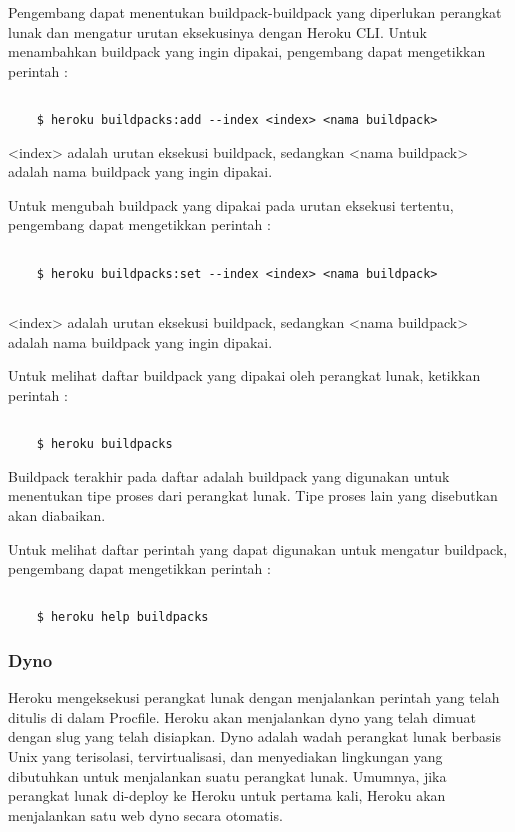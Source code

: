 Pengembang dapat menentukan buildpack-buildpack yang diperlukan perangkat lunak dan mengatur urutan eksekusinya dengan Heroku CLI. Untuk menambahkan buildpack yang ingin dipakai, pengembang dapat mengetikkan perintah :
\begin{lstlisting}

	$ heroku buildpacks:add --index <index> <nama buildpack>

\end{lstlisting}
<index> adalah urutan eksekusi buildpack, sedangkan <nama buildpack> adalah nama buildpack yang ingin dipakai.

Untuk mengubah buildpack yang dipakai pada urutan eksekusi tertentu, pengembang dapat mengetikkan perintah :
\begin{lstlisting}

	$ heroku buildpacks:set --index <index> <nama buildpack>
	
\end{lstlisting}
<index> adalah urutan eksekusi buildpack, sedangkan <nama buildpack> adalah nama buildpack yang ingin dipakai.

Untuk melihat daftar buildpack yang dipakai oleh perangkat lunak, ketikkan perintah :
\begin{lstlisting}

	$ heroku buildpacks

\end{lstlisting}
Buildpack terakhir pada daftar adalah buildpack yang digunakan untuk menentukan tipe proses dari perangkat lunak. Tipe proses lain yang disebutkan akan diabaikan.

Untuk melihat daftar perintah yang dapat digunakan untuk mengatur buildpack, pengembang dapat mengetikkan perintah :
\begin{lstlisting}

	$ heroku help buildpacks

\end{lstlisting}

\subsubsection{Dyno}
Heroku mengeksekusi perangkat lunak dengan menjalankan perintah yang telah ditulis di dalam Procfile. Heroku akan menjalankan dyno yang telah dimuat dengan slug yang telah disiapkan. Dyno adalah wadah perangkat lunak berbasis Unix yang terisolasi, tervirtualisasi, dan menyediakan lingkungan yang dibutuhkan untuk menjalankan suatu perangkat lunak. Umumnya, jika perangkat lunak di-deploy ke Heroku untuk pertama kali, Heroku akan menjalankan satu web dyno secara otomatis.

